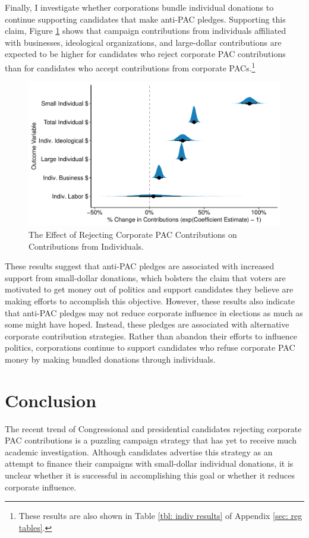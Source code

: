 \documentclass[12pt]{article}
\begin{document}
Finally, I investigate whether corporations bundle individual donations to continue supporting candidates that make anti-PAC pledges. Supporting this claim, Figure \ref{fig: indiv coefs} shows that campaign contributions from individuals affiliated with businesses, ideological organizations, and large-dollar contributions are expected to be higher for candidates who reject corporate PAC contributions than for candidates who accept contributions from corporate PACs.\footnote{These results are also shown in Table \ref{tbl: indiv results} of Appendix \ref{sec: reg tables}.}

\begin{figure}[!htb]\centering
        \includegraphics[width=0.75\linewidth]{indv_coef.pdf}
        \caption{The Effect of Rejecting Corporate PAC Contributions on Contributions from Individuals.}
        \label{fig: indiv coefs}
\end{figure}

These results suggest that anti-PAC pledges are associated with increased support from small-dollar donations, which bolsters the claim that voters are motivated to get money out of politics and support candidates they believe are making efforts to accomplish this objective. However, these results also indicate that anti-PAC pledges may not reduce corporate influence in elections as much as some might have hoped. Instead, these pledges are associated with alternative corporate contribution strategies. Rather than abandon their efforts to influence politics, corporations continue to support candidates who refuse corporate PAC money by making bundled donations through individuals.


\section{Conclusion} \label{sec: conclusion}

The recent trend of Congressional and presidential candidates rejecting corporate PAC contributions is a puzzling campaign strategy that has yet to receive much academic investigation. Although candidates advertise this strategy as an attempt to finance their campaigns with small-dollar individual donations, it is unclear whether it is successful in accomplishing this goal or whether it reduces corporate influence. 
\end{document}
